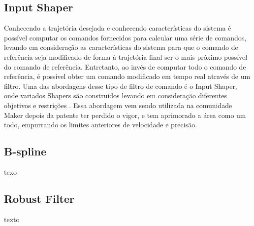 \subsection{Input Shaper}
Conhecendo a trajetória desejada e conhecendo características 
do sistema é possível computar os comandos fornecidos para 
calcular uma série de comandos, levando em consideração as 
características do sistema para que o comando de referência 
seja modificado de forma à trajetória final ser o mais próximo 
possível do comando de referência. Entretanto, ao invés de 
computar todo o comando de referência, é possível obter um 
comando modificado em tempo real através de um filtro. 
Uma das abordagens desse tipo de filtro de comando é o 
Input Shaper, onde variados Shapers são construídos levando 
em consideração diferentes objetivos e restrições 
\cite{singhose97}.
Essa abordagem vem sendo utilizada na comunidade Maker depois 
da patente ter perdido o vigor, e tem aprimorado a área como
um todo, empurrando os limites anteriores de velocidade e 
precisão.

\subsection{B-spline}
texo
\subsection{Robust Filter}
texto